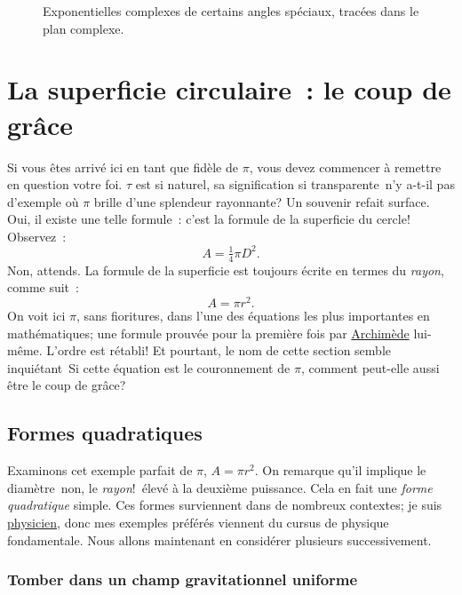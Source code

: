 \begin{figure}
\begin{center}
\end{center}
\caption{Exponentielles complexes de certains angles spéciaux, tracées dans le
plan complexe.\label{fig:tau_euler_circle}}
\end{figure}


\section{La superficie circulaire~: le coup de grâce} %
\label{sec:circular_area}

Si vous êtes arrivé ici en tant que fidèle de $\pi$, vous devez commencer à
remettre en question votre foi. $\tau$ est si naturel, sa signification
si transparente\textellipsis\ n'y a-t-il pas d'exemple où $\pi$ brille d'une
splendeur rayonnante\ns? Un souvenir refait surface. Oui, il existe une telle
formule~: c'est la formule de la superficie du cercle\ns! Observez~:
\[ A = \tfrac{1}{4} \pi D^2. \]
Non, attends. La formule de la superficie est toujours écrite en termes du
\emph{rayon}, comme suit~:
\[ A = \pi r^2. \]
On voit ici $\pi$, sans fioritures, dans l'une des équations les plus
importantes en mathématiques\ns; une formule prouvée pour la première fois par
\href{https://fr.wikipedia.org/wiki/Archimède}{Archimède} lui-même. L'ordre est
rétabli\ns! Et pourtant, le nom de cette section semble inquiétant\textellipsis\
Si cette équation est le couronnement de $\pi$, comment peut-elle aussi être le
coup de grâce\ns?


  \subsection{Formes quadratiques} %
  \label{sec:quadratic_forms}

Examinons cet exemple parfait de $\pi$, $A = \pi r^2$. On remarque qu'il implique
le diamètre\textellipsis\ non, le \emph{rayon}\ns !\ élevé à la deuxième puissance.
Cela en fait une \emph{forme quadratique} simple. Ces formes surviennent
dans de nombreux contextes\ns; je suis
\href{https://thesis.library.caltech.edu/1940/}{physicien}, donc mes exemples
préférés viennent du cursus de physique fondamentale. Nous allons maintenant en
considérer plusieurs successivement.

    \subsubsection{Tomber dans un champ gravitationnel uniforme} %
    \label{sec:falling_in_a_uniform_gravitational_field}


